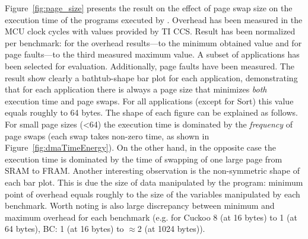 Figure~\ref{fig:page_size} presents the result on the effect of page swap size on the execution time of the programs executed by \sys. Overhead has been measured in the MCU clock cycles with values provided by TI CCS. Result has been normalized per benchmark: for the overhead results---to the minimum obtained value and for page faults---to the third measured maximum value. A subset of applications has been selected for evaluation. Additionally, page faults have been measured. The result show clearly a bathtub-shape bar plot for each application, demonstrating that for each application there is always a page size that minimizes \emph{both} execution time and page swaps. For all applications (except for Sort) this value equals roughly to 64 bytes. The shape of each figure can be explained as follows. For small page sizes (<64) the execution time is dominated by the \emph{frequency} of page swaps (each swap takes non-zero time, as shown in Figure~\ref{fig:dmaTimeEnergy}). On the other hand, in the opposite case the execution time is dominated by the time of swapping of one large page from SRAM to FRAM. Another interesting observation is the non-symmetric shape of each bar plot. This is due the size of data manipulated by the program: minimum point of overhead equals roughly to the size of the variables manipulated by each benchmark. Worth noting is also large discrepancy between minimum and maximum overhead for each benchmark (e.g. for Cuckoo 8 (at 16 bytes) to 1 (at 64 bytes), BC: 1 (at 16 bytes) to $\approx$2 (at 1024 bytes)). 




